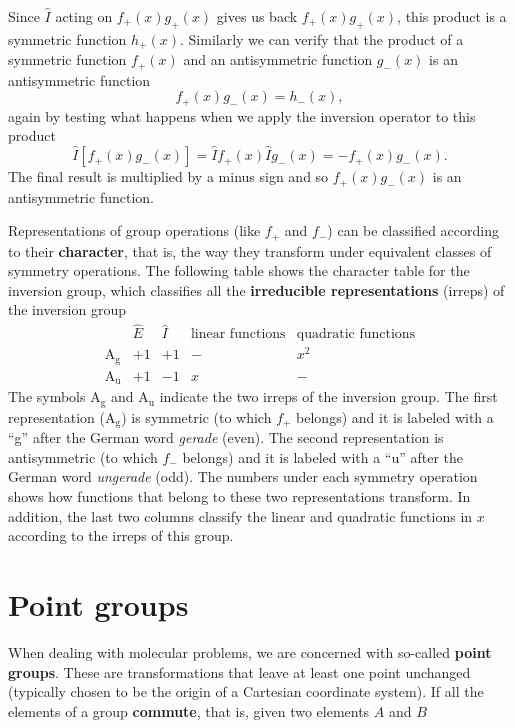 \documentclass[../Main/chem532-notes.tex]{subfiles}
\begin{document}
Since $\hat{I}$ acting on $f_{+}(x) g_{+}(x)$ gives us back $f_{+}(x) g_{+}(x)$, this product is a symmetric function $h_{+}(x)$.
Similarly we can verify that the product of a symmetric function $f_{+}(x)$ and an antisymmetric function $g_{-}(x)$ is an antisymmetric function
\begin{equation}
\label{eq:sym:prod2}
f_{+}(x) g_{-}(x) = h_{-}(x),
\end{equation}
again by testing what happens when we apply the inversion operator to this product
\begin{equation}
\hat{I} \left[ f_{+}(x) g_{-}(x) \right] = 
\hat{I} f_{+}(x)  \hat{I} g _{-}(x) = - f_{+}(x) g_{-}(x).
\end{equation}
The final result is multiplied by a minus sign and so $f_{+}(x) g_{-}(x)$ is an antisymmetric function.

Representations of group operations (like $f_{+}$ and $f_{-}$) can be classified according to their \textbf{character}, that is, the way they transform under equivalent classes of symmetry operations.
The following table shows the character table for the inversion group, which classifies all the \textbf{irreducible representations} (irreps) of the inversion group
\begin{equation}
   \begin{array}{c|cccc} %
          & \hat{E} & \hat{I} & \text{linear functions} &  \text{quadratic functions} \\
   \hline
     \mathrm{A_g} & +1 & +1 & - & x^2\\
     \mathrm{A_u} & +1 & -1 & x & -
   \end{array}
\end{equation}
The symbols $\mathrm{A_g}$ and $\mathrm{A_u}$ indicate the two irreps of the inversion group. The first representation ($\mathrm{A_g}$) is symmetric (to which $f_{+}$ belongs) and it is labeled with a ``g'' after the German word \textit{gerade} (even).
The second representation is antisymmetric (to which $f_{-}$ belongs) and it is labeled with a ``u'' after the German word \textit{ungerade} (odd).
The numbers under each symmetry operation shows how functions that belong to these two representations transform.
In addition, the last two columns classify the linear and quadratic functions in $x$ according to the irreps of this group.

\section{Point groups}
When dealing with molecular problems, we are concerned with so-called \textbf{point groups}.
These are transformations that leave at least one point unchanged (typically chosen to be the origin of a Cartesian coordinate system).
If all the elements of a group \textbf{commute}, that is, given two elements $A$ and $B$ 
\end{document}
